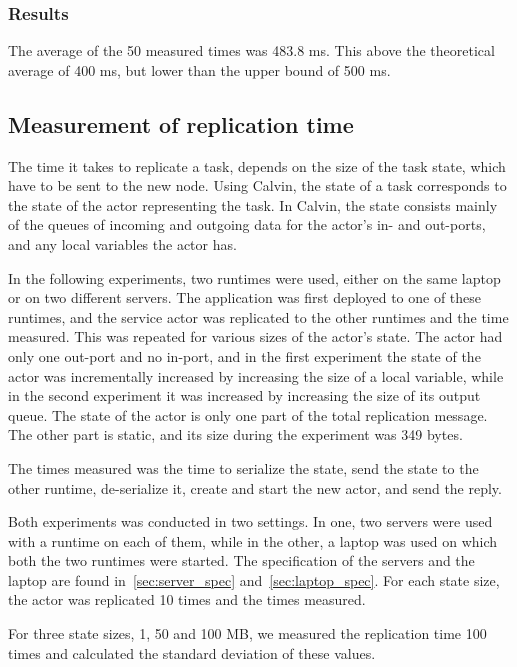 \documentclass{cslthse-msc}
\begin{document}
\subsubsection*{Results}
The average of the 50 measured times was 483.8 ms. This above the theoretical average of 400 ms, but lower than the upper bound of 500 ms. 

\subsection{Measurement of replication time} \label{sec:eval_repl_time}
The time it takes to replicate a task, depends on the size of the task state, which have to be sent to the new node. Using Calvin, the state of a task corresponds to the state of the actor representing the task. In Calvin, the state consists mainly of the queues of incoming and outgoing data for the actor's in- and out-ports, and any local variables the actor has.

In the following experiments, two runtimes were used, either on the same laptop or on two different servers. The application was first deployed to one of these runtimes, and the service actor was replicated to the other runtimes and the time measured. This was repeated for various sizes of the actor's state. The actor had only one out-port and no in-port, and in the first experiment the state of the actor was incrementally increased by increasing the size of a local variable, while in the second experiment it was increased by increasing the size of its output queue. The state of the actor is only one part of the total replication message. The other part is static, and its size during the experiment was 349 bytes.

The times measured was the time to serialize the state, send the state to the other runtime, de-serialize it, create and start the new actor, and send the reply.

Both experiments was conducted in two settings. In one, two servers were used with a runtime on each of them, while in the other, a laptop was used on which both the two runtimes were started. The specification of the servers and the laptop are found in~\cref{sec:server_spec} and~\cref{sec:laptop_spec}. For each state size, the actor was replicated 10 times and the times measured.

For three state sizes, 1, 50 and 100 MB, we measured the replication time 100 times and calculated the standard deviation of these values.
\end{document}
